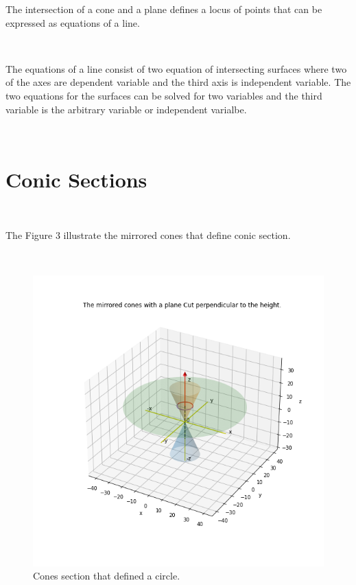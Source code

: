 \documentclass[10pt,a4paper,leqno]{article}
\begin{document}
\begin{CJK*}{UTF8}{gbsn}
\noindent The intersection of a cone and a plane defines a locus of points that can be expressed as equations of a line.
 \par \ \par\noindent The equations of a line consist of two equation of intersecting surfaces where two of the axes are dependent variable and the third axis is independent variable. The two equations for the surfaces can be solved for two variables and the third variable is the arbitrary variable or independent varialbe.
 \par \ \par\noindent \section{Conic Sections }
 \par \ \par\noindent The Figure 3 illustrate the mirrored cones that define conic section.
 \par \ \par\begin{figure}[H]
\centering\includegraphics[width=1\linewidth,height=0.7\textheight]{Data/fgr03.png}
\caption{Cones section that defined a circle. }
\label{fig:Data/fgr03.png}
\end{figure}


\end{CJK*}
\end{document}
